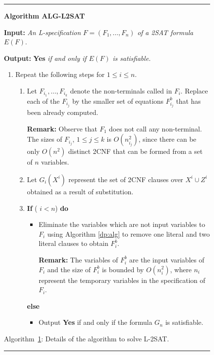 {\small
\begin{figure}[tbp]
\rule{\textwidth}{0.01in}

\noindent
{\bf Algorithm ALG-L2SAT} 

\noindent
{\bf Input:} {\it An L-specification} $F = (F_1, \ldots , F_n)$
{\it of a 2SAT formula } $E(F)$.  

\noindent
{\bf Output:} {\bf Yes} {\it if and only if $E(F)$ is satisfiable.} 

\begin{enumerate}

\item
Repeat the following steps for $1 \leq i \leq n$.

\begin{enumerate}


\item
Let $F_{i_1}, \ldots, F_{i_k}$ denote the non-terminals called in $F_i$.
Replace each of the $F_{i_j}$ by the smaller set of equations $F^b_{i_j}$
that has been already computed.

\noindent
{\bf Remark:} Observe that $F_1$ does not call any non-terminal. 
The sizes of $F_{i_j}$, $ 1 \leq j \leq k$ is $O(n_{i_j}^2)$, since
there can be only $O(n^2)$ distinct {\sf 2CNF}  that can be formed
from a set of $n$ variables. 


\item 
Let $G_i(X^i)$ represent the set of 2CNF clauses   over $X^i \cup Z^i$
obtained as a result of substitution.


\item
{\bf If} ( $ i < n  $) {\bf do}
\begin{itemize}
\item
Eliminate the variables which are not input variables to $F_i$ 
using  Algorithm \ref{dp:alg} to
remove one literal and two literal clauses to obtain $F^b_i$.

\noindent
{\bf Remark:} The variables of $F^b_i$ are the input variables of $F_i$
and the size of $F^b_i$ is bounded by $O(n_i^2)$, where $n_i$ represent
the temporary variables in the specification of $F_i$.

\end{itemize}
{\bf else}
\begin{itemize}
\item
Output {\bf Yes} if and only if the formula $G_n$ is satisfiable.
\end{itemize}

\end{enumerate}

\end{enumerate}
\label{l2sat:alg}
\begin{center}
Algorithm~\ref{l2sat:alg}: Details of the algorithm to solve {\sf L-2SAT}.
\end{center}
\vspace*{-.2in}
\rule{\textwidth}{0.01in}
\end{figure}
}
\newspacing



